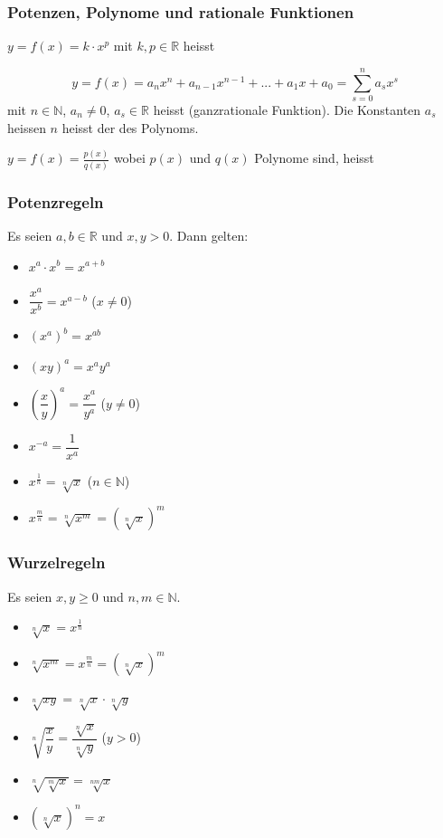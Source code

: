 \subsubsection{Potenzen, Polynome und rationale Funktionen}

$y=f(x)=k\cdot x^p$ mit $k,p \in \mathbb{R}$ heisst 

$$y=f(x)=a_nx^n + a_{n-1}x^{n-1}+...+a_1x+a_0 = \sum_{s=0}^{n}a_sx^s$$ mit $n \in \mathbb{N}$, $a_n \neq 0$, $a_s \in \mathbb{R}$ heisst  (ganzrationale Funktion). Die Konstanten $a_s$ heissen  $n$ heisst der  des Polynoms.

$y=f(x)=\frac{p(x)}{q(x)}$ wobei $p(x)$ und $q(x)$ Polynome sind, heisst 

\subsubsection{Potenzregeln}

Es seien $a,b\in\mathbb{R}$ und $x,y>0$. Dann gelten:

\begin{itemize}
    \item $x^a \cdot x^b = x^{a+b}$
    \item $\dfrac{x^a}{x^b}=x^{a-b}$ \quad ($x\neq 0$)
    \item $(x^a)^b=x^{ab}$
    \item $(xy)^a=x^a y^a$
    \item $\left(\dfrac{x}{y}\right)^a=\dfrac{x^a}{y^a}$ \quad ($y\neq 0$)
    \item $x^{-a}=\dfrac{1}{x^a}$
    \item $x^{\frac{1}{n}}=\sqrt[n]{x}$ \quad ($n\in\mathbb{N}$)
    \item $x^{\frac{m}{n}}=\sqrt[n]{x^m}=\left(\sqrt[n]{x}\right)^m$
\end{itemize}

\subsubsection{Wurzelregeln}

Es seien $x,y\geq 0$ und $n,m\in\mathbb{N}$.

\begin{itemize}
    \item $\sqrt[n]{x}=x^{\frac{1}{n}}$
    \item $\sqrt[n]{x^m}=x^{\frac{m}{n}}=\left(\sqrt[n]{x}\right)^m$
    \item $\sqrt[n]{xy}=\sqrt[n]{x}\cdot\sqrt[n]{y}$
    \item $\sqrt[n]{\dfrac{x}{y}}=\dfrac{\sqrt[n]{x}}{\sqrt[n]{y}}$ \quad ($y>0$)
    \item $\sqrt[n]{\sqrt[m]{x}}=\sqrt[nm]{x}$
    \item $\left(\sqrt[n]{x}\right)^n=x$
\end{itemize}

